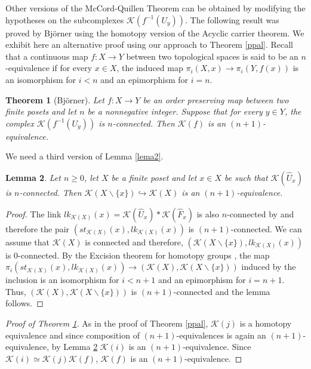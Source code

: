 \documentclass[11pt,twoside]{amsart}
\theoremstyle{plain}
\newtheorem{lema}{Lemma}[section]
\newtheorem{teo}[lema]{Theorem}
\theoremstyle{remark}
\theoremstyle{definition}
\newcommand{\kp}{\mathcal{K}}
\begin{document}
Other versions of the McCord-Quillen Theorem can be obtained by modifying the hypotheses on the subcomplexes $\kp (f^{-1}(U_y))$. The following result was proved by Bj\"orner \cite[Theorem 2]{Bjo2} using the homotopy version of the Acyclic carrier theorem. We exhibit here an alternative proof using our approach to Theorem \ref{ppal}. Recall that a continuous map $f:X\to Y$ between two topological spaces is said to be an $n$-equivalence if for every $x\in X$, the induced map $\pi _i (X,x)\to \pi _i (Y,f(x))$ is an isomorphism for $i<n$ and an epimorphism for $i=n$. 

\begin{teo}[Bj\"orner] \label{ppalbjorner}
Let $f:X\to Y$ be an order preserving map between two finite posets and let $n$ be a nonnegative integer. Suppose that for every $y\in Y$, the complex $\kp(f^{-1}(U_y))$ is $n$-connected. Then $\kp(f)$ is an $(n+1)$-equivalence.  
\end{teo}

We need a third version of Lemma \ref{lema2}.

\begin{lema} \label{lema2bjorner}
Let $n\ge 0$, let $X$ be a finite poset and let $x\in X$ be such that $\kp(\hat{U}_x)$ is $n$-connected. Then $\kp(X\smallsetminus \{x\}) \hookrightarrow \kp(X)$ is an $(n+1)$-equivalence.
\end{lema}
\begin{proof}
The link $lk_{\kp (X)}(x)=\kp (\hat{U}_x)*\kp(\hat{F}_x)$ is also $n$-connected by \cite[Lemma 2.3]{Mil} and therefore the pair $(st_{\kp (X)}(x), lk_{\kp (X)}(x))$ is $(n+1)$-connected. We can assume that $\kp (X)$ is connected and therefore, $(\kp (X\smallsetminus \{x\}), lk_{\kp (X)}(x))$ is $0$-connected. By the Excision theorem for homotopy groups \cite[Theorem 4.23]{Hat}, the map $\pi_i (st_{\kp (X)}(x), lk_{\kp (X)}(x))\to (\kp (X), \kp (X\smallsetminus \{x\}))$ induced by the inclusion is an isomorphism for $i<n+1$ and an epimorphism for $i=n+1$. Thus, $(\kp (X), \kp (X\smallsetminus \{x\}))$ is $(n+1)$-connected and the lemma follows.
\end{proof}

\begin{proof}[Proof of Theorem \ref{ppalbjorner}]
As in the proof of Theorem \ref{ppal}, $\kp (j)$ is a homotopy equivalence and since composition of $(n+1)$-equivalences is again an $(n+1)$-equivalence, by Lemma \ref{lema2bjorner} $\kp (i)$ is an $(n+1)$-equivalence. Since $\kp (i)\simeq \kp (j) \kp (f)$, $\kp (f)$ is an $(n+1)$-equivalence.
\end{proof}
\end{document}
